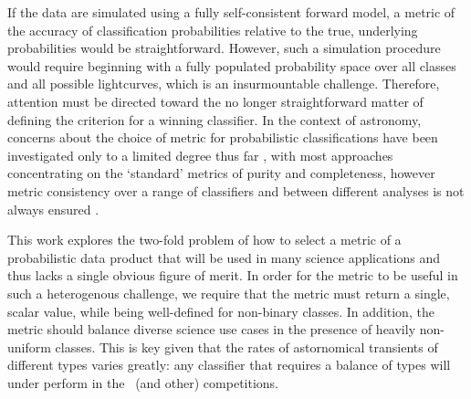 If the data are simulated using a fully self-consistent forward model, a metric of the accuracy of classification probabilities relative to the true, underlying probabilities would be straightforward.
However, such a simulation procedure would require beginning with a fully populated probability space over all classes and all possible lightcurves, which is an insurmountable challenge.
Therefore, attention must be directed toward the no longer straightforward matter of defining the criterion for a winning classifier.
In the context of astronomy, concerns about the choice of metric for probabilistic classifications have been investigated only to a limited degree thus far \citep{2018SoPh..293...28F, 2017MNRAS.464.4463K}, with most approaches concentrating on the `standard' metrics of purity and completeness, however metric consistency over a range of classifiers and between different analyses is not always ensured \citep{2018A&C....23...15B}.

This work explores the two-fold problem of how to select a metric of a probabilistic data product that will be used in many science applications and thus lacks a single obvious figure of merit.
In order for the metric to be useful in such a heterogenous challenge, we require that the metric must return a single, scalar value, while being well-defined for non-binary classes.
In addition, the metric should balance diverse science use cases in the presence of heavily non-uniform classes.
This is key given that the rates of astornomical transients of different types varies greatly: any classifier that requires a balance of types will under perform in the \plasticc\ (and other) competitions.

